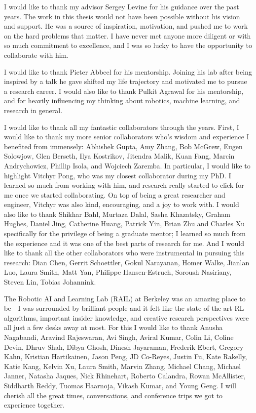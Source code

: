I would like to thank my advisor Sergey Levine for his guidance over the past years.
The work in this thesis would not have been possible without his vision and support.
He was a source of inspiration, motivation, and pushed me to work on the hard problems that matter.
I have never met anyone more diligent or with so much commitment to excellence, and I was so lucky to have the opportunity to collaborate with him.

I would like to thank Pieter Abbeel for his mentorship.
Joining his lab after being inspired by a talk he gave shifted my life trajectory and motivated me to pursue a research career.
I would also like to thank Pulkit Agrawal for his mentorship, and for heavily influencing my thinking about robotics, machine learning, and research in general.

I would like to thank all my fantastic collaborators through the years.
First, I would like to thank my more senior collaborators who's wisdom and experience I benefited from immensely: Abhishek Gupta, Amy Zhang, Bob McGrew, Eugen Solowjow, Glen Berseth, Ilya Kostrikov, Jitendra Malik, Kuan Fang, Marcin Andrychowicz, Phillip Isola, and Wojciech Zaremba.
In particular, I would like to highlight Vitchyr Pong, who was my closest collaborator during my PhD.
I learned so much from working with him, and research really started to click for me once we started collaborating.
On top of being a great researcher and engineer, Vitchyr was also kind, encouraging, and a joy to work with.
I would also like to thank Shikhar Bahl, Murtaza Dalal, Sasha Khazatsky, Graham Hughes, Daniel Jing, Catherine Huang, Patrick Yin, Brian Zhu and Charles Xu specifically for the privilege of being a graduate mentor; I learned so much from the experience and it was one of the best parts of research for me.
And I would like to thank all the other collaborators who were instrumental in pursuing this research: Dian Chen, Gerrit Schoettler, Gokul Narayanan, Homer Walke, Jianlan Luo, Laura Smith, Matt Yan, Philippe Hansen-Estruch, Soroush Nasiriany, Steven Lin, Tobias Johannink.

The Robotic AI and Learning Lab (RAIL) at Berkeley was an amazing place to be - I was surrounded by brilliant people and it felt like the state-of-the-art RL algorithms, important insider knowledge, and creative research perspectives were all just a few desks away at most.
For this I would like to thank Anusha Nagabandi, Aravind Rajeswaran, Avi Singh, Aviral Kumar, Colin Li, Coline Devin, Dhruv Shah, Dibya Ghosh, Dinesh Jayaraman, Frederik Ebert, Gregory Kahn, Kristian Hartikainen, Jason Peng, JD Co-Reyes, Justin Fu, Kate Rakelly, Katie Kang, Kelvin Xu, Laura Smith, Marvin Zhang, Michael Chang, Michael Janner, Natasha Jaques, Nick Rhinehart, Roberto Calandra, Rowan McAllister, Siddharth Reddy, Tuomas Haarnoja, Vikash Kumar, and Young Geng.
I will cherish all the great times, conversations, and conference trips we got to experience together.


